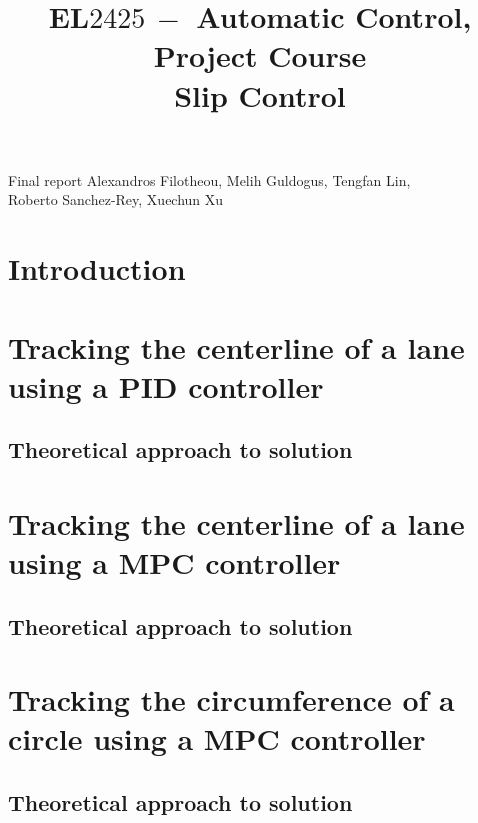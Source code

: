 \documentclass[a4paper,12pt,oneside,onecolumn]{article} %
\title{
	\vspace{1in}
  EL$2425\ -$ Automatic Control, Project Course \\
  \vspace{0.2in}
  Slip Control
}
\begin{document}
	\maketitle

  \vfill

  \begin{center}

    \large Final report
    \vfill
    Alexandros Filotheou, Melih Guldogus, Tengfan Lin,\\ Roberto Sanchez-Rey, Xuechun Xu
  \end{center}

  \newpage

\section{Introduction}

  

  \section{Tracking the centerline of a lane using a PID controller}

    \subsection{Theoretical approach to solution}
      


  \section{Tracking the centerline of a lane using a MPC controller}

    \subsection{Theoretical approach to solution}
      


  \section{Tracking the circumference of a circle using a MPC controller}

    \subsection{Theoretical approach to solution}
      
\end{document}
